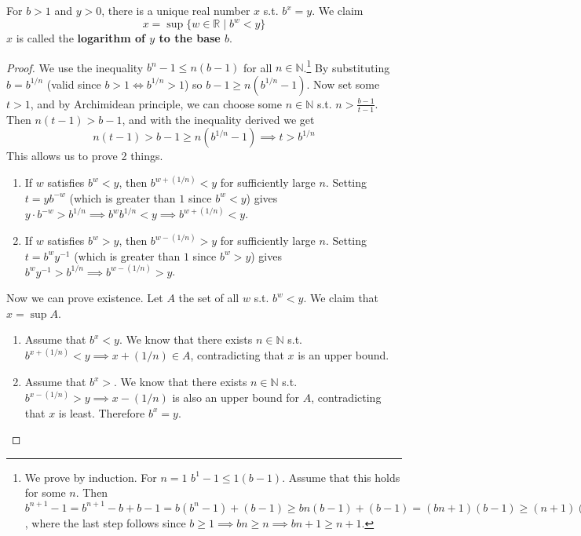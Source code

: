   \begin{theorem}[Logarithm]
    For $b > 1$ and $y > 0$, there is a unique real number $x$ s.t. $b^x = y$. We claim 
    \begin{equation}
      x = \sup\{ w \in \mathbb{R} \mid b^w < y \}
    \end{equation}
    $x$ is called the \textbf{logarithm of $y$ to the base $b$}. 
  \end{theorem}
  \begin{proof}
    We use the inequality $b^n - 1 \leq n (b-1)$ for all $n \in \mathbb{N}$.\footnote{We prove by induction. For $n=1$ $b^1 - 1 \leq 1 (b-1)$. Assume that this holds for some $n$. Then $b^{n+1} - 1 = b^{n+1} - b + b - 1 = b (b^n - 1) + (b-1) \geq bn (b-1) + (b-1) = (bn + 1) (b-1) \geq (n+1) (b-1)$, where the last step follows since $b \geq 1 \implies bn \geq n \implies bn + 1 \geq n + 1$. } By substituting $b = b^{1/n}$ (valid since $b > 1 \iff b^{1/n} > 1$) so $b-1 \geq n(b^{1/n} - 1)$. Now set some $t > 1$, and by Archimidean principle, we can choose some $n \in \mathbb{N}$ s.t. $n > \frac{b-1}{t-1}$. Then $n (t-1) > b-1$, and with the inequality derived we get 
    \begin{equation}
      n (t - 1) > b - 1 \geq n (b^{1/n} - 1) \implies t > b^{1/n}
    \end{equation} 
    This allows us to prove 2 things. 
    \begin{enumerate}
      \item If $w$ satisfies $b^w < y$, then $b^{w + (1/n)} < y$ for sufficiently large $n$. Setting $t = y b^{-w}$ (which is greater than $1$ since $b^w < y$) gives $y \cdot b^{-w} > b^{1/n} \implies b^w b^{1/n} < y \implies b^{w + (1/n)} < y$. 
      \item If $w$ satisfies $b^w > y$, then $b^{w - (1/n)} > y$ for sufficiently large $n$. Setting $t = b^w y^{-1}$ (which is greater than $1$ since $b^w > y$) gives $b^w y^{-1} > b^{1/n} \implies b^{w - (1/n)} > y$. 
    \end{enumerate}
    Now we can prove existence. Let $A$ the set of all $w$ s.t. $b^w < y$. We claim that $x = \sup{A}$. 
    \begin{enumerate}
      \item Assume that $b^x < y$. We know that there exists $n \in \mathbb{N}$ s.t. $b^{x + (1/n)} < y \implies x + (1/n) \in A$, contradicting that $x$ is an upper bound. 
      \item Assume that $b^x > $. We know that there exists $n \in \mathbb{N}$ s.t. $b^{x - (1/n)} > y \implies x - (1/n)$ is also an upper bound for $A$, contradicting that $x$ is least. Therefore $b^x = y$. 

\end{enumerate}
\end{proof}

